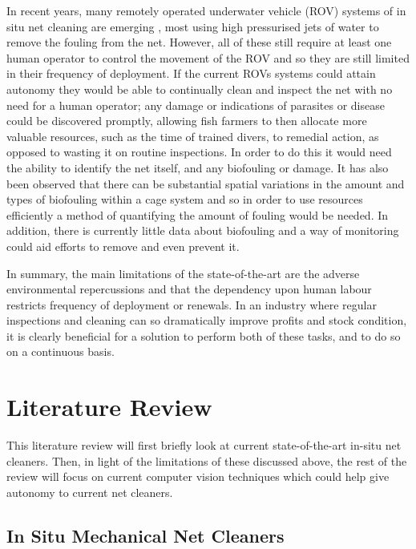 \documentclass[11.5pt, twoside, a4paper]{article}
\begin{document}
In recent years, many remotely operated underwater vehicle (ROV) systems of in situ net cleaning are emerging \cite{AKVA, MIC, Yanmar}, most using high pressurised jets of water to remove the fouling from the net. However, all of these still require at least one human operator to control the movement of the ROV and so they are still limited in their frequency of deployment. If the current ROVs systems could attain autonomy they would be able to continually clean and inspect the net with no need for a human operator; any damage or indications of parasites or disease could be discovered promptly, allowing fish farmers to then allocate more valuable resources, such as the time of trained divers, to remedial action, as opposed to wasting it on routine inspections. In order to do this it would need the ability to identify the net itself, and any biofouling or damage.  It has also been observed that there can be substantial spatial variations in the amount and types of biofouling within a cage system \cite{fitridge2012impact,hodson1997biofouling} and so in order to use resources efficiently a method of quantifying the amount of fouling would be needed. In addition, there is currently little data about biofouling and a way of monitoring could aid efforts to remove and even prevent it.

In summary, the main limitations of the state-of-the-art are the adverse environmental repercussions and that the dependency upon human labour restricts frequency of deployment or renewals. In an industry where regular inspections and cleaning can so dramatically improve profits and stock condition, it is clearly beneficial for a solution to perform both of these tasks, and to do so on a continuous basis.

\section{Literature Review}

This literature review will first briefly look at current state-of-the-art in-situ net cleaners. Then, in light of the limitations of these discussed above, the rest of the review will focus on current computer vision techniques which could help give autonomy to current net cleaners.

\subsection{In Situ Mechanical Net Cleaners}
\end{document}
